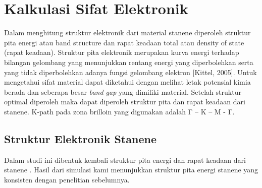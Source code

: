 \section{Kalkulasi Sifat Elektronik}
Dalam menghitung struktur elektronik dari material stanene diperoleh struktur pita energi atau band structure dan rapat keadaan total atau density of state (rapat keadaan). Struktur pita elektronik merupakan kurva energi terhadap bilangan gelombang yang menunjukkan rentang energi yang diperbolehkan serta yang tidak diperbolehkan adanya fungsi gelombang elektron [Kittel, 2005]. Untuk mengetahui sifat material dapat diketahui dengan melihat letak potensial kimia berada dan seberapa besar \textit{band gap} yang dimiliki material. Setelah struktur optimal diperoleh maka dapat diperoleh struktur pita dan
rapat keadaan dari stanene. K-path pada zona brilloin yang digunakan adalah
Γ – K – M - Γ.

\subsection{Struktur Elektronik Stanene}
Dalam studi ini dibentuk kembali struktur pita energi dan rapat keadaan dari stanene . Hasil dari simulasi kami menunjukkan struktur pita energi stanene yang konsisten dengan penelitian sebelumnya. 

